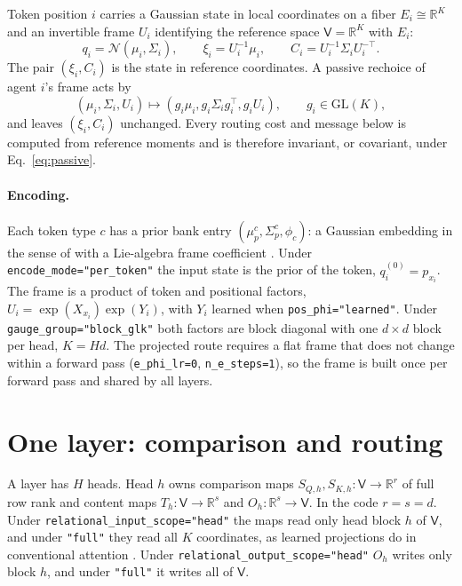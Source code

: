 \documentclass[11pt]{article}
\theoremstyle{definition}
\theoremstyle{remark}
\newcommand{\N}{\mathcal{N}}
\newcommand{\cfg}[1]{\texttt{#1}}
\begin{document}
Token position $i$ carries a Gaussian state in local coordinates on a fiber $E_i\cong\mathbb R^K$ and an invertible frame $U_i$ identifying the reference space $\mathsf V=\mathbb R^K$ with $E_i$:
\begin{equation}
q_i=\N(\mu_i,\Sigma_i),\qquad
\xi_i=U_i^{-1}\mu_i,\qquad
C_i=U_i^{-1}\Sigma_iU_i^{-\top}.
\label{eq:reference_moments}
\end{equation}
The pair $(\xi_i,C_i)$ is the state in reference coordinates. A passive rechoice of agent $i$'s frame acts by
\begin{equation}
(\mu_i,\Sigma_i,U_i)\mapsto(g_i\mu_i,g_i\Sigma_ig_i^{\top},g_iU_i),\qquad g_i\in\mathrm{GL}(K),
\label{eq:passive}
\end{equation}
and leaves $(\xi_i,C_i)$ unchanged. Every routing cost and message below is computed from reference moments and is therefore invariant, or covariant, under Eq.~\eqref{eq:passive}.

\paragraph{Encoding.}
Each token type $c$ has a prior bank entry $(\mu_p^c,\Sigma_p^c,\phi_c)$: a Gaussian embedding in the sense of \citet{vilnis2015} with a Lie-algebra frame coefficient \citep{dennis2026glk}. Under \cfg{encode\_mode="per\_token"} the input state is the prior of the token, $q_i^{(0)}=p_{x_i}$. The frame is a product of token and positional factors, $U_i=\exp(X_{x_i})\exp(Y_i)$, with $Y_i$ learned when \cfg{pos\_phi="learned"}. Under \cfg{gauge\_group="block\_glk"} both factors are block diagonal with one $d\times d$ block per head, $K=Hd$. The projected route requires a flat frame that does not change within a forward pass (\cfg{e\_phi\_lr=0}, \cfg{n\_e\_steps=1}), so the frame is built once per forward pass and shared by all layers.

\section{One layer: comparison and routing}
\label{sec:routing}

A layer has $H$ heads. Head $h$ owns comparison maps $S_{Q,h},S_{K,h}:\mathsf V\to\mathbb R^{r}$ of full row rank and content maps $T_h:\mathsf V\to\mathbb R^{s}$ and $O_h:\mathbb R^{s}\to\mathsf V$. In the code $r=s=d$. Under \cfg{relational\_input\_scope="head"} the maps read only head block $h$ of $\mathsf V$, and under \cfg{"full"} they read all $K$ coordinates, as learned projections do in conventional attention \citep{vaswani2017}. Under \cfg{relational\_output\_scope="head"} $O_h$ writes only block $h$, and under \cfg{"full"} it writes all of $\mathsf V$.
\end{document}
